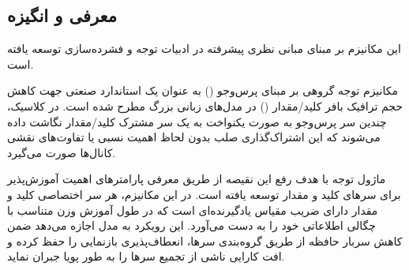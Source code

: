 \subsection{معرفی و انگیزه}
این مکانیزم بر مبنای مبانی نظری پیشرفته در ادبیات توجه و فشرده‌سازی \cite{ainslie2023gqa} توسعه یافته است.

مکانیزم توجه گروهی بر مبنای پرس‌وجو () به عنوان یک استاندارد صنعتی جهت کاهش حجم ترافیک بافر کلید/مقدار () در مدل‌های زبانی بزرگ مطرح شده است. در  کلاسیک، چندین سر پرس‌وجو به صورت یکنواخت به یک سر مشترک کلید/مقدار نگاشت داده می‌شوند که این اشتراک‌گذاری صلب بدون لحاظ اهمیت نسبی یا تفاوت‌های نقشی کانال‌ها صورت می‌گیرد.

ماژول توجه  با هدف رفع این نقیصه از طریق معرفی پارامترهای اهمیت آموزش‌پذیر برای سرهای کلید و مقدار توسعه یافته است. در این مکانیزم، هر سر اختصاصی کلید و مقدار دارای ضریب مقیاس یادگیرنده‌ای است که در طول آموزش وزن متناسب با چگالی اطلاعاتی خود را به دست می‌آورد. این رویکرد به مدل اجازه می‌دهد ضمن کاهش سربار حافظه از طریق گروه‌بندی سرها، انعطاف‌پذیری بازنمایی را حفظ کرده و افت کارایی ناشی از تجمیع سرها را به طور پویا جبران نماید.
